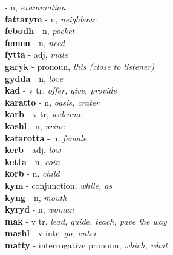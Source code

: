  - n, \emph{examination}\\ \vspace{7pt}\textbf{fattarym}   - n, \emph{neighbour}\\ \vspace{7pt}\textbf{febodh}   - n, \emph{pocket}\\ \vspace{7pt}\textbf{femen}   - n, \emph{need}\\ \vspace{7pt}\textbf{fytta}   - adj, \emph{male}\\ \vspace{7pt}\textbf{garyk}   - pronoun, \emph{this (close to listener)}\\ \vspace{7pt}\textbf{gydda}   - n, \emph{love}\\ \vspace{7pt}\textbf{kad}   - v tr, \emph{offer, give, provide}\\ \vspace{7pt}\textbf{karatto}   - n, \emph{oasis, crater}\\ \vspace{7pt}\textbf{karb}   - v tr, \emph{welcome}\\ \vspace{7pt}\textbf{kashl}   - n, \emph{urine}\\ \vspace{7pt}\textbf{katarotta}   - n, \emph{female}\\ \vspace{7pt}\textbf{kerb}   - adj, \emph{low}\\ \vspace{7pt}\textbf{ketta}   - n, \emph{coin}\\ \vspace{7pt}\textbf{korb}   - n, \emph{child}\\ \vspace{7pt}\textbf{kym}   - conjunction, \emph{while, as}\\ \vspace{7pt}\textbf{kyng}   - n, \emph{mouth}\\ \vspace{7pt}\textbf{kyryd}   - n, \emph{woman}\\ \vspace{7pt}\textbf{mak}   - v tr, \emph{lead, guide, teach, pave the way}\\ \vspace{7pt}\textbf{mashl}   - v intr, \emph{go, enter}\\ \vspace{7pt}\textbf{matty}   - interrogative pronoun, \emph{which, what}\\ 